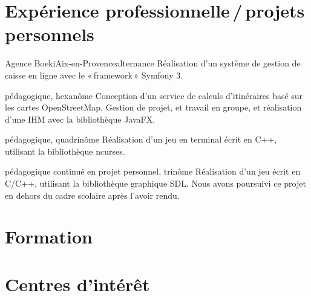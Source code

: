 \documentclass[11pt,a4paper]{moderncv}
\begin{document}
\section{Expérience professionnelle\,/\,projets personnels}
        {Agence Boeki}{Aix-en-Provence}{alternance}{
          Réalisation d'un système de gestion de caisse en ligne avec le «\,framework\,» Symfony 3.
        }

        {pédagogique, hexanôme}{}{}{
          Conception d'un service de calculs d'itinéraires basé sur les cartes OpenStreetMap.\newline
          Gestion de projet, et travail en groupe, et réalisation d'une IHM avec la bibliothèque JavaFX.
        }

        {pédagogique, quadrinôme}{}{}{
          Réalisation d'un jeu en terminal écrit en C++, utilisant la bibliothèque ncurses.
        }

        {pédagogique continué en projet personnel, trinôme}{}{}{
          Réalisation d'un jeu écrit en C/C++, utilisant la bibliothèque graphique SDL.
          Nous avons poursuivi ce projet en dehors du cadre scolaire après l'avoir rendu.
        }

\section{Formation}


\section{Centres d'intérêt}



        
\end{document}
